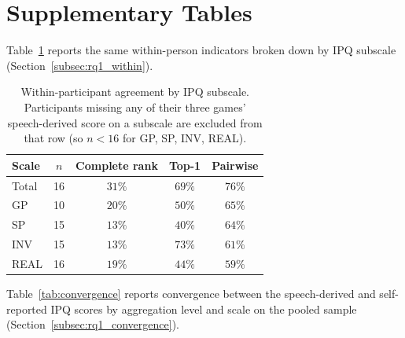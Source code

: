 \clearpage
\appendix
\section{Supplementary Tables}
\label{sec:appendix}

Table~\ref{tab:within_by_construct} reports the same within-person indicators broken down by IPQ subscale (Section~\ref{subsec:rq1_within}).

\begin{table}[htbp]
\centering
\caption{Within-participant agreement by IPQ subscale. Participants missing any of their three games' speech-derived score on a subscale are excluded from that row (so $n<16$ for GP, SP, INV, REAL).}
\label{tab:within_by_construct}
\small
\begin{tabular}{lcccc}
\hline
Scale & $n$ & Complete rank & Top-1 & Pairwise \\
\hline
Total & 16 & $31\%$ & $69\%$ & $76\%$ \\
GP & 10 & $20\%$ & $50\%$ & $65\%$ \\
SP & 15 & $13\%$ & $40\%$ & $64\%$ \\
INV & 15 & $13\%$ & $73\%$ & $61\%$ \\
REAL & 16 & $19\%$ & $44\%$ & $59\%$ \\
\hline
\end{tabular}
\end{table}

Table~\ref{tab:convergence} reports convergence between the speech-derived and self-reported IPQ scores by aggregation level and scale on the pooled sample (Section~\ref{subsec:rq1_convergence}).

